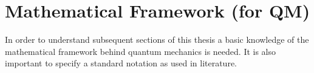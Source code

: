 

\section{Mathematical Framework (for QM)}
	
		In order to understand subsequent sections of this thesis a basic knowledge of the mathematical framework behind quantum mechanics is needed.
		 It is also important to specify a standard notation as used in literature.
	
	
